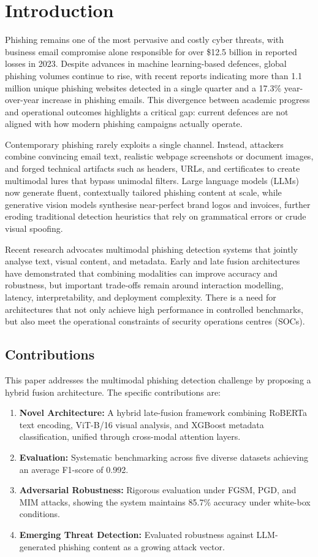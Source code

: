 \documentclass[conference]{IEEEtran}
\begin{document}
\section{Introduction}

Phishing remains one of the most pervasive and costly cyber threats, with business email compromise alone responsible for over \$12.5 billion in reported losses in 2023. Despite advances in machine learning-based defences, global phishing volumes continue to rise, with recent reports indicating more than 1.1 million unique phishing websites detected in a single quarter and a 17.3\% year-over-year increase in phishing emails. This divergence between academic progress and operational outcomes highlights a critical gap: current defences are not aligned with how modern phishing campaigns actually operate.

Contemporary phishing rarely exploits a single channel. Instead, attackers combine convincing email text, realistic webpage screenshots or document images, and forged technical artifacts such as headers, URLs, and certificates to create multimodal lures that bypass unimodal filters. Large language models (LLMs) now generate fluent, contextually tailored phishing content at scale, while generative vision models synthesise near-perfect brand logos and invoices, further eroding traditional detection heuristics that rely on grammatical errors or crude visual spoofing.

Recent research advocates multimodal phishing detection systems that jointly analyse text, visual content, and metadata. Early and late fusion architectures have demonstrated that combining modalities can improve accuracy and robustness, but important trade-offs remain around interaction modelling, latency, interpretability, and deployment complexity. There is a need for architectures that not only achieve high performance in controlled benchmarks, but also meet the operational constraints of security operations centres (SOCs).

\subsection{Contributions}

This paper addresses the multimodal phishing detection challenge by proposing a hybrid fusion architecture. The specific contributions are:
\begin{enumerate}
    \item \textbf{Novel Architecture:} A hybrid late-fusion framework combining RoBERTa text encoding, ViT-B/16 visual analysis, and XGBoost metadata classification, unified through cross-modal attention layers.
    \item \textbf{Evaluation:} Systematic benchmarking across five diverse datasets achieving an average F1-score of 0.992.
    \item \textbf{Adversarial Robustness:} Rigorous evaluation under FGSM, PGD, and MIM attacks, showing the system maintains 85.7\% accuracy under white-box conditions.
    \item \textbf{Emerging Threat Detection:} Evaluated robustness against LLM-generated phishing content as a growing attack vector.
\end{enumerate}
\end{document}
